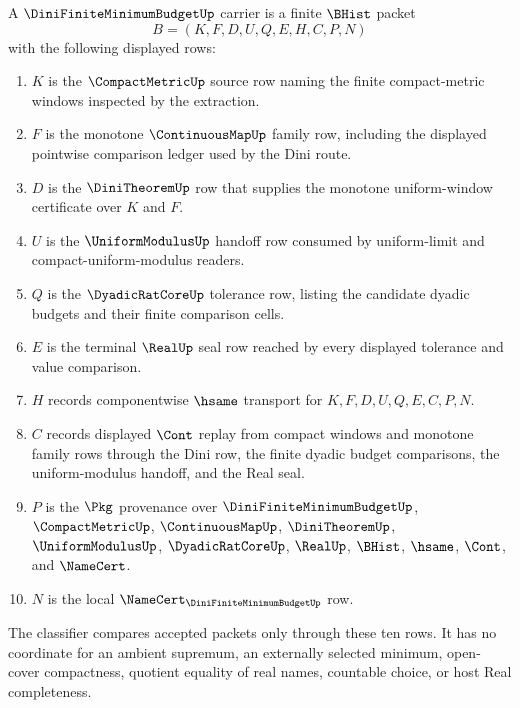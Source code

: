 \begin{definition}
\label{def:dini-finite-minimum-budget-carrier}
A $\DiniFiniteMinimumBudgetUp$ carrier is a finite $\BHist$ packet
$$
B=(K,F,D,U,Q,E,H,C,P,N)
$$
with the following displayed rows:
\begin{enumerate}
\item $K$ is the $\CompactMetricUp$ source row naming the finite compact-metric windows inspected by the extraction.
\item $F$ is the monotone $\ContinuousMapUp$ family row, including the displayed pointwise comparison ledger used by the Dini route.
\item $D$ is the $\DiniTheoremUp$ row that supplies the monotone uniform-window certificate over $K$ and $F$.
\item $U$ is the $\UniformModulusUp$ handoff row consumed by uniform-limit and compact-uniform-modulus readers.
\item $Q$ is the $\DyadicRatCoreUp$ tolerance row, listing the candidate dyadic budgets and their finite comparison cells.
\item $E$ is the terminal $\RealUp$ seal row reached by every displayed tolerance and value comparison.
\item $H$ records componentwise $\hsame$ transport for $K,F,D,U,Q,E,C,P,N$.
\item $C$ records displayed $\Cont$ replay from compact windows and monotone family rows through the Dini row, the finite dyadic budget comparisons, the uniform-modulus handoff, and the Real seal.
\item $P$ is the $\Pkg$ provenance over $\DiniFiniteMinimumBudgetUp$, $\CompactMetricUp$, $\ContinuousMapUp$, $\DiniTheoremUp$, $\UniformModulusUp$, $\DyadicRatCoreUp$, $\RealUp$, $\BHist$, $\hsame$, $\Cont$, and $\NameCert$.
\item $N$ is the local $\NameCert_{\DiniFiniteMinimumBudgetUp}$ row.
\end{enumerate}
The classifier compares accepted packets only through these ten rows. It has no coordinate for an ambient supremum, an externally selected minimum, open-cover compactness, quotient equality of real names, countable choice, or host Real completeness.
\end{definition}

